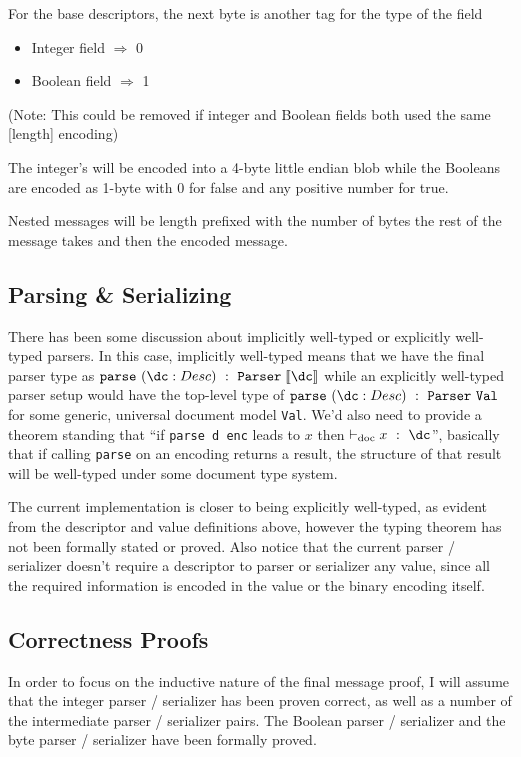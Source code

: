 For the base descriptors, the next byte is another tag for the type of the field
\begin{itemize}
\item Integer field $\Rightarrow$ 0
\item Boolean field $\Rightarrow$ 1
\end{itemize}
(Note: This could be removed if integer and Boolean fields both used the same
[length] encoding)

The integer's will be encoded into a 4-byte little endian blob while the
Booleans are encoded as 1-byte with 0 for false and any positive number for
true.

Nested messages will be length prefixed with the number of bytes the rest of the
message takes and then the encoded message.

\subsection{Parsing \& Serializing}

There has been some discussion about implicitly well-typed or explicitly
well-typed parsers. In this case, implicitly well-typed means that we have the
final parser type as
$\mathtt{parse}\ (\dc : Desc)\ :\ \mathtt{Parser}\;\denote{\dc}$ while
an explicitly well-typed parser setup would have the top-level type of
$\mathtt{parse}\ (\dc : Desc)\ :\ \mathtt{Parser}\ \mathtt{Val}$ for some generic,
universal document model \texttt{Val}. We'd also need to provide a theorem
standing that ``if \texttt{parse d enc} leads to $x$ then
$\vdash_{\mathrm{doc}} x\ :\ \dc$'', basically that if calling \texttt{parse} on an
encoding returns a result, the structure of that result will be well-typed under
some document type system.

The current implementation is closer to being explicitly well-typed, as evident
from the descriptor and value definitions above, however the typing theorem has
not been formally stated or proved. Also notice that the current parser /
serializer doesn't require a descriptor to parser or serializer any value, since
all the required information is encoded in the value or the binary encoding
itself.

\subsection{Correctness Proofs}

In order to focus on the inductive nature of the final message proof, I will
assume that the integer parser / serializer has been proven correct, as well as
a number of the intermediate parser / serializer pairs. The Boolean parser /
serializer and the byte parser / serializer have been formally proved.

